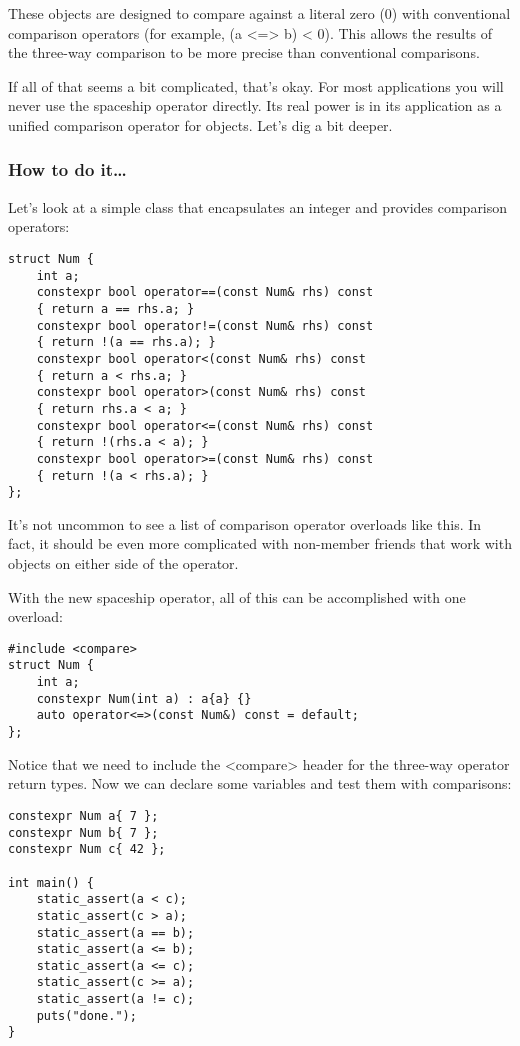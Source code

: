 These objects are designed to compare against a literal zero (0) with conventional comparison operators (for example, (a <=> b) < 0). This allows the results of the three-way comparison to be more precise than conventional comparisons.

If all of that seems a bit complicated, that's okay. For most applications you will never use the spaceship operator directly. Its real power is in its application as a unified comparison operator for objects. Let's dig a bit deeper.

\subsubsection{How to do it…}

Let's look at a simple class that encapsulates an integer and provides comparison operators:

\begin{lstlisting}[style=styleCXX]
struct Num {
	int a;
	constexpr bool operator==(const Num& rhs) const
	{ return a == rhs.a; }
	constexpr bool operator!=(const Num& rhs) const
	{ return !(a == rhs.a); }
	constexpr bool operator<(const Num& rhs) const
	{ return a < rhs.a; }
	constexpr bool operator>(const Num& rhs) const
	{ return rhs.a < a; }
	constexpr bool operator<=(const Num& rhs) const
	{ return !(rhs.a < a); }
	constexpr bool operator>=(const Num& rhs) const
	{ return !(a < rhs.a); }
};
\end{lstlisting}

It's not uncommon to see a list of comparison operator overloads like this. In fact, it should be even more complicated with non-member friends that work with objects on either side of the operator.

With the new spaceship operator, all of this can be accomplished with one overload:

\begin{lstlisting}[style=styleCXX]
#include <compare>
struct Num {
	int a;
	constexpr Num(int a) : a{a} {}
	auto operator<=>(const Num&) const = default;
};
\end{lstlisting}

Notice that we need to include the <compare> header for the three-way operator return types. Now we can declare some variables and test them with comparisons:

\begin{lstlisting}[style=styleCXX]
constexpr Num a{ 7 };
constexpr Num b{ 7 };
constexpr Num c{ 42 };

int main() {
	static_assert(a < c);
	static_assert(c > a);
	static_assert(a == b);
	static_assert(a <= b);
	static_assert(a <= c);
	static_assert(c >= a);
	static_assert(a != c);
	puts("done.");
}
\end{lstlisting}

